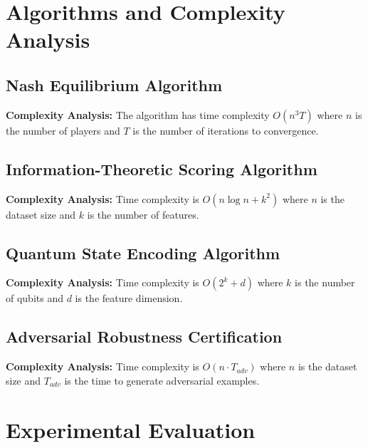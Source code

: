 \documentclass[journal]{IEEEtran}
\begin{document}
\section{Algorithms and Complexity Analysis}\label{sec:algorithms}

\subsection{Nash Equilibrium Algorithm}


\textbf{Complexity Analysis:} The algorithm has time complexity $O(n^3 T)$ where $n$ is the number of players and $T$ is the number of iterations to convergence.

\subsection{Information-Theoretic Scoring Algorithm}


\textbf{Complexity Analysis:} Time complexity is $O(n \log n + k^2)$ where $n$ is the dataset size and $k$ is the number of features.

\subsection{Quantum State Encoding Algorithm}


\textbf{Complexity Analysis:} Time complexity is $O(2^k + d)$ where $k$ is the number of qubits and $d$ is the feature dimension.

\subsection{Adversarial Robustness Certification}


\textbf{Complexity Analysis:} Time complexity is $O(n \cdot T_{adv})$ where $n$ is the dataset size and $T_{adv}$ is the time to generate adversarial examples.

\section{Experimental Evaluation}\label{sec:experiments}
\end{document}
